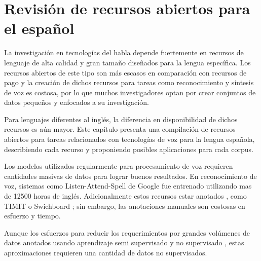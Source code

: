 

\chapter{Revisión de recursos abiertos para el español}

La investigación en tecnologías del habla depende fuertemente en recursos de lenguaje de alta calidad y gran tamaño diseñados para la lengua específica. Los recursos abiertos de este tipo son más escasos en comparación con recursos de pago y la creación de dichos recursos para tareas como reconocimiento y síntesis de voz es costosa, por lo que muchos investigadores optan por crear conjuntos de datos pequeños y enfocados a su investigación.

Para lenguajes diferentes al inglés, la diferencia en disponibilidad de dichos recursos es aún mayor. Este capítulo presenta una compilación de recursos abiertos para tareas relacionados con tecnologías de voz para la lengua española, describiendo cada recurso y proponiendo posibles aplicaciones para cada corpus. 


Los modelos utilizados regularmente para procesamiento de voz requieren cantidades masivas de datos para lograr buenos resultados. En reconocimiento de voz, sistemas como Listen-Attend-Spell de Google \cite{Chiu2018} fue entrenado utilizando mas de 12500 horas de inglés. Adicionalmente estos recursos  estar anotados , como TIMIT \cite{TIMIT} o Swichboard \cite{Switchboard}; sin embargo, las anotaciones manuales son costosas en esfuerzo y tiempo.

Aunque los esfuerzos para reducir los requerimientos por grandes volúmenes de datos anotados usando aprendizaje semi supervisado \cite{AmazonSemiSupervised} y no supervisado \cite{ZeroResources}, estas aproximaciones requieren una  cantidad  de datos no supervisados.

